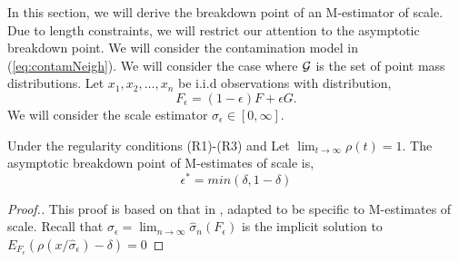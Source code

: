 In this section, we will derive the breakdown point of an M-estimator of scale. Due to length constraints, we will restrict our attention to the asymptotic breakdown point. We will consider the contamination model in (\ref{eq:contamNeigh}). We will consider the case where $\mathcal{G}$ is the set of point mass distributions. Let $x_1, x_2, \hdots, x_n$ be i.i.d observations with distribution, 
$$ F_\epsilon = (1-\epsilon)F + \epsilon G.$$
We will consider the scale estimator $\sigma_\epsilon \in [0, \infty]$.

\begin{thm}
Under the regularity conditions (R1)-(R3) and Let $\lim_{t\xrightarrow{}\infty} \rho(t) = 1$. The asymptotic breakdown point of M-estimates of scale is,
$$ \epsilon^* = min(\delta,1-\delta) $$
\end{thm}
\begin{proof}[Proof.]
This proof is based on that in \cite{maronna2019robust}, adapted to be specific to M-estimates of scale. Recall that $ \sigma_\epsilon = \lim_{n \xrightarrow{} \infty} \hat \sigma_n(F_\epsilon) $ is the implicit solution to $E_{F_\epsilon} (\rho(x/\hat\sigma_\epsilon) - \delta) = 0$


\end{proof}
